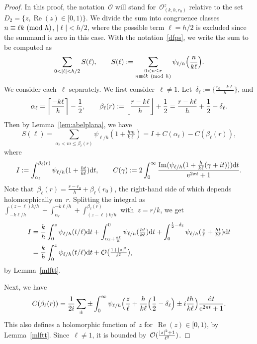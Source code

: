 \documentclass[11pt]{amsart}
\renewcommand{\mod}[1]{~\pr{\textnormal{mod}~#1}}
\theoremstyle{definition}
\newcommand{\ssum}[1]{\sum_{\substack{#1}}}
\newcommand{\pr}[1]{\mathchoice{\left( #1\right)}{(#1)}{(#1)}{(#1)}}
\newcommand{\floor}[1]{{\left\lfloor {#1} \right\rfloor}}
\newcommand{\e}[1][]{\ifthenelse{\equal{#1}{}}{{\rm e}}{\operatorname{e}\pr{ #1}}}
\newcommand{\df}{\mathrm{d}}
\newcommand{\Oh}{\mathcal{O}}
\renewcommand\Re{\operatorname{Re}}
\renewcommand\Im{\operatorname{Im}}
\newcommand{\1}{{\mathbf 1}}
\newcommand{\abs}[1]{\left|#1\right|}
\let\originalleft\left
\let\originalright\right
\renewcommand{\left}{\mathopen{}\mathclose\bgroup\originalleft}
\renewcommand{\right}{\aftergroup\egroup\originalright}
\numberwithin{equation}{section}
\begin{document}
\begin{proof}
  In this proof, the notation~$\Oh$ will stand for~$\Oh_{(k,h,r_0)}^z$ relative to the set~$D_2 = \{z, \Re(z)\in[0, 1)\}$. We divide the sum into congruence classes $n\equiv \ell k\mod h$, $|\ell|<h/2$, where the possible term $\ell=h/2$ is excluded since the summand is zero in this case. With the notation~\eqref{dfps}, we write the sum to be computed as
  $$ \sum_{0 < \abs{\ell} < h/2} S(\ell), \qquad S(\ell) := \ssum{0<n\leq r \\ n\equiv \ell k \mod{h}} \psi_{\ell/h}\Big(\frac{n}{k\ell}\Big). $$
  We consider each~$\ell$ separately. 
  We first consider~$\ell \neq 1$. Let~$\delta_\ell := \{\frac{r_0-k\ell}{h}\}$, and
  $$ \alpha_\ell = \left\lceil\frac{-k\ell}h\right\rceil - \frac12, \qquad \beta_\ell(r) := \floor{\frac{r-k\ell}{h}} + \frac12 = \frac{r-k\ell}{h} + \frac12 - \delta_{\ell}. $$
  Then by Lemma~\ref{lem:abelplana}, we have
  $$ S(\ell) = \sum_{\alpha_\ell < m \leq \beta_\ell(r)} \psi_{\ell/h}(1 + \tfrac{hm}{k\ell}) = I + C(\alpha_\ell) - C(\beta_\ell(r)), $$
  where
  \begin{align*}
    I := \int_{\alpha_\ell}^{\beta_\ell(r)} \psi_{\ell/h}(1 + \tfrac{ht}{k\ell})\df t, \qquad  C(\gamma) := 2 \int_0^\infty \frac{\Im (\psi_{\ell/h}(1+\frac{h}{k\ell}(\gamma + it)))\df t}{\e^{2\pi t} + 1}.
  \end{align*}
Note that~$\beta_\ell(r) = \frac{r-r_0}h + \beta_\ell(r_0)$, the right-hand side of which depends holomorphically on~$r$.
Splitting the integral as $ \int_{- {k\ell}/h}^{(z-\ell) k/h}+\int_{\alpha_\ell}^{- {k\ell}/h}+\int_{(z-\ell) k/h}^{\beta_\ell(r)}$ with~$z = r/k$, we get
  \begin{align*}
    I &{} =
        \frac{k}h \int_0^{z} \psi_{\ell/h}(t/\ell)\df t + \int_{\alpha_\ell+\frac{k\ell}h}^{0}\psi_{\ell/h}(\tfrac{ht}{k\ell})\df t + \int_0^{\frac12-\delta_\ell} \psi_{\ell/h}(\tfrac z\ell+\tfrac{ht}{k\ell})\df t \\
    &{} =  \frac{k}h \int_0^{z} \psi_{\ell/h}(t/\ell)\df t + \Oh\big(\tfrac{1+\abs{z}^2}{\ell^2}\big),
  \end{align*}
  by Lemma~\ref{mlftt}.

  Next, we have
  $$ C(\beta_\ell(r)) = \frac1{2i}\sum_\pm \pm \int_0^\infty \psi_{\ell/h}\Big(\frac z\ell + \frac{h}{k\ell}\Big(\frac12-\delta_\ell\Big) \pm i\frac{t h}{k\ell}\Big)\frac{\df t}{\e^{2\pi t}+1}. $$
  This also defines a holomorphic function of~$z$ for~$\Re(z) \in [0, 1)$, by Lemma~\ref{mlftt}. Since~$\ell \neq 1$, it is bounded by~$\Oh(\frac{\abs{z}^2+1}{\ell^2})$.%
  

\end{proof}
\end{document}
